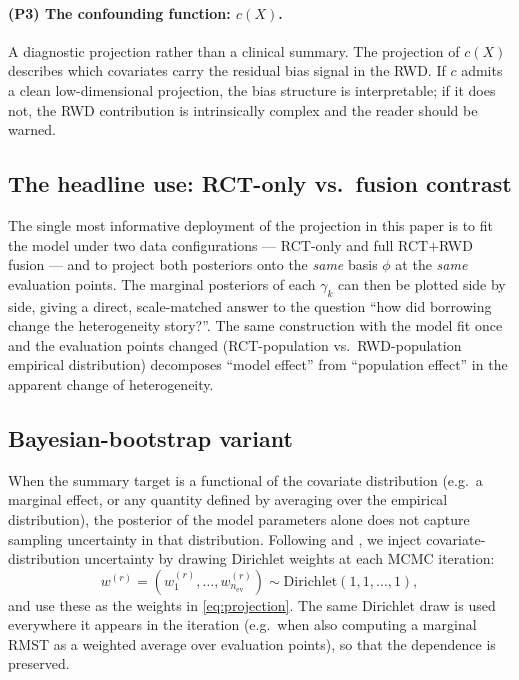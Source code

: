 \documentclass[11pt]{article}
\newcommand{\X}{X}
\newcommand{\cf}{c}
\begin{document}
\paragraph{(P3) The confounding function: $\cf(\X)$.}
A diagnostic projection rather than a clinical summary. The projection of
$\cf(\X)$ describes which covariates carry the residual bias signal in the
RWD. If $\cf$ admits a clean low-dimensional projection, the bias structure
is interpretable; if it does not, the RWD contribution is intrinsically
complex and the reader should be warned.

\subsection{The headline use: RCT-only vs.\ fusion contrast}

The single most informative deployment of the projection in this paper is
to fit the model under two data configurations --- RCT-only and full
RCT$+$RWD fusion --- and to project both posteriors onto the \emph{same}
basis $\phi$ at the \emph{same} evaluation points. The marginal posteriors
of each $\gamma_{k}$ can then be plotted side by side, giving a direct,
scale-matched answer to the question ``how did borrowing change the
heterogeneity story?''. The same construction with the model fit once and
the evaluation points changed (RCT-population vs.\ RWD-population
empirical distribution) decomposes ``model effect'' from
``population effect'' in the apparent change of heterogeneity.

\subsection{Bayesian-bootstrap variant}

When the summary target is a functional of the covariate distribution
(e.g.\ a marginal effect, or any quantity defined by averaging over the
empirical distribution), the posterior of the model parameters alone does
not capture sampling uncertainty in that distribution. Following
\citet{Rubin1981} and \citet{Antonelli2019}, we inject covariate-distribution
uncertainty by drawing Dirichlet weights at each MCMC iteration:
\begin{equation}
  w^{(r)} = (w_{1}^{(r)}, \ldots, w_{n_{\mathrm{ev}}}^{(r)}) \sim
  \mathrm{Dirichlet}(1, 1, \ldots, 1),
  \label{eq:bb}
\end{equation}
and use these as the weights in \eqref{eq:projection}. The same Dirichlet
draw is used everywhere it appears in the iteration (e.g.\ when also
computing a marginal RMST as a weighted average over evaluation points),
so that the dependence is preserved.
\end{document}
